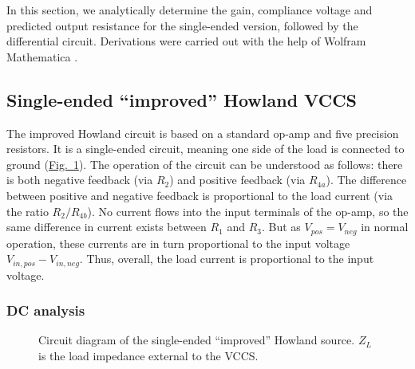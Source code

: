 \documentclass[10pt]{article}
\newcommand{\brieffiglink}[1]{\hyperref[#1]{Fig.~\ref*{#1}}}
\begin{document}
In this section, we analytically determine the gain, compliance voltage and predicted output resistance for the single-ended version, followed by the differential circuit. Derivations were carried out with the help of Wolfram Mathematica \cite{mathematica}.


\subsection{Single-ended ``improved'' Howland VCCS}
\label{sec:single_ended_howland}

The improved Howland circuit is based on a standard op-amp and five precision resistors. It is a single-ended circuit, meaning one side of the load is connected to ground (\brieffiglink{fig:single_ended_howland}). The operation of the circuit can be understood as follows: there is both negative feedback (via $R_2$) and positive feedback (via $R_{4a}$). The difference between positive and negative feedback is proportional to the load current (via the ratio $R_2/R_{4b}$). No current flows into the input terminals of the op-amp, so the same difference in current exists between $R_1$ and $R_3$. But as $V_{pos}=V_{neg}$ in normal operation, these currents are in turn proportional to the input voltage $V_{in,pos}-V_{in,neg}$. Thus, overall, the load current is proportional to the input voltage.


\subsubsection{DC analysis}

\begin{figure}
\centering

\caption{\small Circuit diagram of the single-ended ``improved'' Howland source. $Z_L$ is the load impedance external to the VCCS.}
\label{fig:single_ended_howland}
\end{figure}
\end{document}
